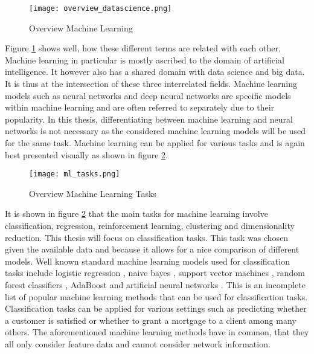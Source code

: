 	\begin{figure}[h]
		\centering
		\texttt{[image: overview\_datascience.png]}
		\caption{Overview Machine Learning}
		\citep{Frauenhofer2021}
		\label{fig:ml_overview}
	\end{figure} 

	\noindent Figure \ref{fig:ml_overview} shows well, how these different
	terms are related with each other. Machine learning in particular is
	mostly ascribed to the domain of artificial intelligence. It however also 
	has a shared domain with data science and big data. It is thus at the
	intersection of these three interrelated fields. Machine learning models 
	such as neural networks and deep neural networks are specific models within
	machine learning and are often referred to separately due to their
	popularity. In this thesis, differentiating between machine learning and
	neural networks is not necessary as the considered machine learning models
	will be used for the same task. Machine learning can be applied for various
	tasks and is again best presented visually as shown in figure 
	\ref{fig:ml_tasks}.

	\begin{figure}[h]
		\centering
		\texttt{[image: ml\_tasks.png]}
		\caption{Overview Machine Learning Tasks}
		\cite{Artisan2020}
		\label{fig:ml_tasks}
	\end{figure} 

	\noindent It is shown in figure \ref{fig:ml_tasks} that the main tasks for
	machine learning involve classification, regression, reinforcement
	learning, clustering and dimensionality reduction. This thesis will focus
	on classification tasks. This task was chosen given the available data and 
	because it allows for a nice comparison of different models. Well known 
	standard machine learning models used for classification tasks include 
	logistic regression \citep{cramer2002origins}, naive bayes 
	\citep{zhang2004bayes}, support vector machines 
	\citep{platt1999probabilistic}, random forest classifiers
	\citep{breiman2001random}, AdaBoost \citep{freund1997decision} and
	artificial neural networks \citep{mcculloch1943logical}. This is an
	incomplete list of popular machine learning methods that can be used for
	classification tasks. Classification tasks can be applied for various
	settings such as predicting whether a customer is satisfied or whether to
	grant a mortgage to a client among many others. The aforementioned machine
	learning methods have in common, that they all only consider feature data
	and cannot consider network information. \\

